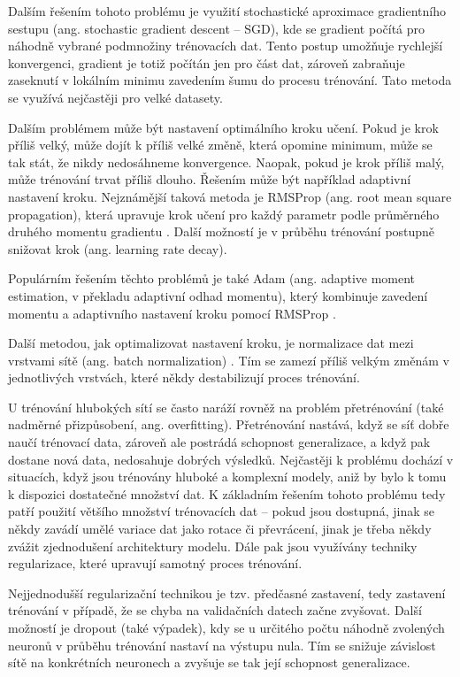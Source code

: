 Dalším řešením tohoto problému je využití stochastické aproximace gradientního
sestupu (ang. stochastic gradient descent – SGD), kde se gradient počítá pro
náhodně vybrané podmnožiny trénovacích dat. Tento postup umožňuje rychlejší
konvergenci, gradient je totiž počítán jen pro část dat, zároveň zabraňuje
zaseknutí v lokálním minimu zavedením šumu do procesu trénování. Tato metoda se
využívá nejčastěji pro velké datasety.

Dalším problémem může být nastavení optimálního kroku učení. Pokud je krok
příliš velký, může dojít k příliš velké změně, která opomine minimum, může se
tak stát, že nikdy nedosáhneme konvergence. Naopak, pokud je krok příliš malý,
může trénování trvat příliš dlouho. Řešením může být například adaptivní
nastavení kroku. Nejznámější taková metoda je RMSProp (ang. root mean square
propagation), která upravuje krok učení pro každý parametr podle průměrného
druhého momentu gradientu \cite{RMSProp}. Další možností je v průběhu trénování
postupně snižovat krok (ang. learning rate decay).

Populárním řešením těchto problémů je také Adam (ang. adaptive moment
estimation, v překladu adaptivní odhad momentu), který kombinuje zavedení
momentu a adaptivního nastavení kroku pomocí RMSProp \cite{adam}.

Další metodou, jak optimalizovat nastavení kroku, je normalizace dat mezi
vrstvami sítě (ang. batch normalization) \cite{batchnorm}. Tím se zamezí příliš
velkým změnám v jednotlivých vrstvách, které někdy destabilizují proces
trénování.

U trénování hlubokých sítí se často naráží rovněž na problém přetrénování (také
nadměrné přizpůsobení, ang. overfitting). Přetrénování nastává, když se síť
dobře naučí trénovací data, zároveň ale postrádá schopnost generalizace, a když
pak dostane nová data, nedosahuje dobrých výsledků. Nejčastěji k problému
dochází v situacích, když jsou trénovány hluboké a komplexní modely, aniž by
bylo k tomu k dispozici dostatečné množství dat. K základním řešením tohoto
problému tedy patří použití většího množství trénovacích dat – pokud jsou
dostupná, jinak se někdy zavádí umělé variace dat jako rotace či převrácení,
jinak je třeba někdy zvážit zjednodušení architektury modelu. Dále pak jsou
využívány techniky regularizace, které upravují samotný proces trénování.

Nejjednodušší regularizační technikou je tzv. předčasné zastavení, tedy
zastavení trénování v případě, že se chyba na validačních datech začne
zvyšovat. Další možností je dropout (také výpadek), kdy se u určitého počtu
náhodně zvolených neuronů v průběhu trénování nastaví na výstupu nula. Tím se
snižuje závislost sítě na konkrétních neuronech a zvyšuje se tak její schopnost
generalizace.

